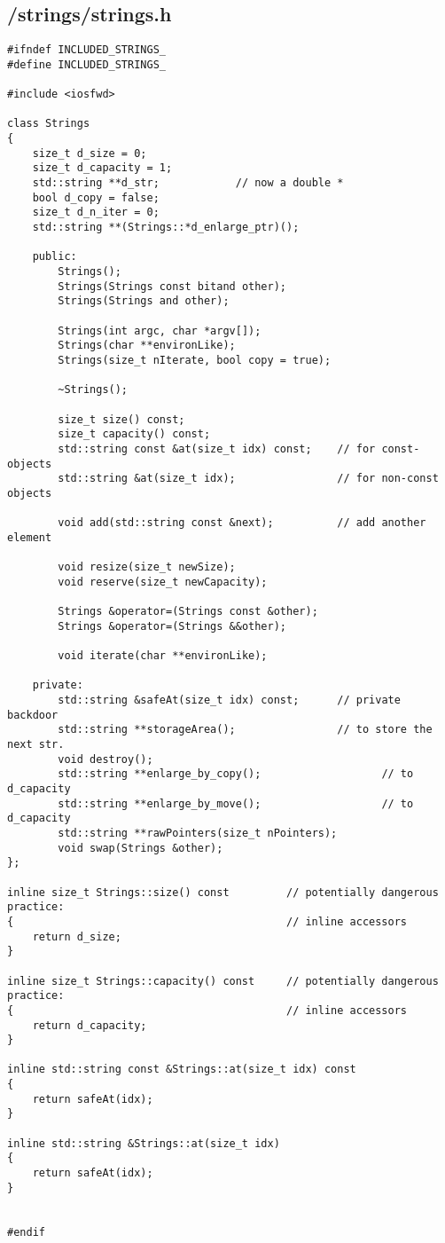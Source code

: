 \documentclass{article}
\begin{document}
\subsection*{/strings/strings.h}
\begin{verbatim}
#ifndef INCLUDED_STRINGS_
#define INCLUDED_STRINGS_

#include <iosfwd>

class Strings
{
    size_t d_size = 0;
    size_t d_capacity = 1;
    std::string **d_str;            // now a double *
    bool d_copy = false;
    size_t d_n_iter = 0;
    std::string **(Strings::*d_enlarge_ptr)();

    public:
        Strings();
        Strings(Strings const bitand other);
        Strings(Strings and other);

        Strings(int argc, char *argv[]);
        Strings(char **environLike);
        Strings(size_t nIterate, bool copy = true);

        ~Strings();

        size_t size() const;
        size_t capacity() const;
        std::string const &at(size_t idx) const;    // for const-objects
        std::string &at(size_t idx);                // for non-const objects

        void add(std::string const &next);          // add another element

        void resize(size_t newSize);
        void reserve(size_t newCapacity);

        Strings &operator=(Strings const &other);
        Strings &operator=(Strings &&other);

        void iterate(char **environLike);
        
    private:
        std::string &safeAt(size_t idx) const;      // private backdoor
        std::string **storageArea();                // to store the next str.
        void destroy();                 
        std::string **enlarge_by_copy();                   // to d_capacity
        std::string **enlarge_by_move();                   // to d_capacity
        std::string **rawPointers(size_t nPointers);
        void swap(Strings &other);
};

inline size_t Strings::size() const         // potentially dangerous practice:
{                                           // inline accessors
    return d_size;
}

inline size_t Strings::capacity() const     // potentially dangerous practice:
{                                           // inline accessors
    return d_capacity;
}

inline std::string const &Strings::at(size_t idx) const
{
    return safeAt(idx);
}

inline std::string &Strings::at(size_t idx)
{
    return safeAt(idx);
}

        
#endif


\end{verbatim}
\end{document}

